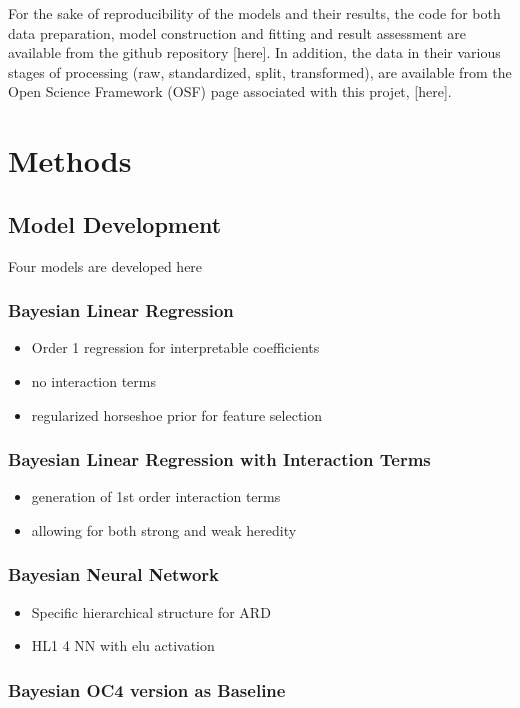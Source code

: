 \documentclass[10pt]{article}
\begin{document}
For the sake of reproducibility of the models and their results, the code for both data preparation, model construction and fitting and result assessment are available from the github repository [here]. In addition,  the data in their various stages of processing (raw, standardized, split, transformed), are available from the Open Science Framework (OSF) page associated with this projet, [here].
			
\newpage			

\section{Methods}
	\subsection{Model Development}
	Four models are developed here		
		\subsubsection{Bayesian Linear Regression}
			\begin{itemize}
				\item Order 1 regression for interpretable coefficients
				\item no interaction terms
				\item regularized horseshoe prior for feature selection
			\end{itemize}
		\subsubsection{Bayesian Linear Regression with Interaction Terms}
			\begin{itemize}
				\item generation of 1st order interaction terms
				\item allowing for both strong and weak heredity
			\end{itemize}
		\subsubsection{Bayesian Neural Network}
			\begin{itemize}
				\item Specific hierarchical structure for ARD
				\item HL1 4 NN with elu activation
			\end{itemize}
		\subsubsection{Bayesian OC4 version as Baseline}
	
\end{document}
